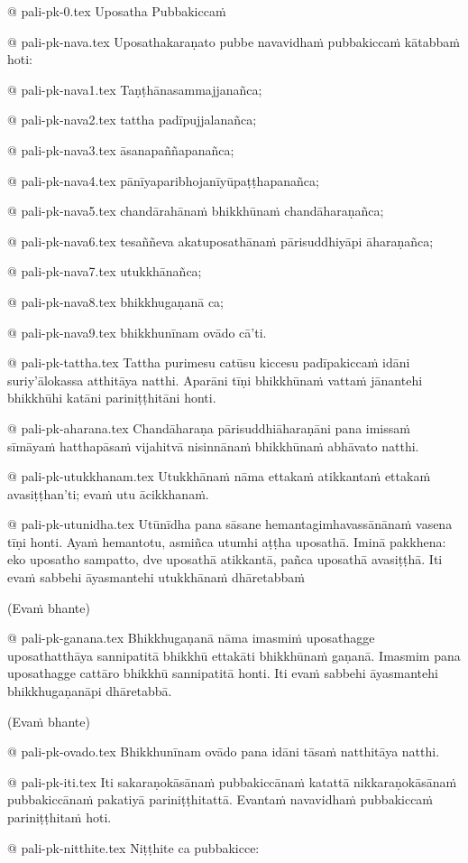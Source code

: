 @ pali-pk-0.tex
Uposatha Pubbakiccaṁ

@ pali-pk-nava.tex
Uposathakaraṇato pubbe navavidhaṁ pubbakiccaṁ kātabbaṁ hoti:

@ pali-pk-nava1.tex
Taṇṭhānasammajjanañca;

@ pali-pk-nava2.tex
tattha padīpujjalanañca;

@ pali-pk-nava3.tex
āsanapaññapanañca;

@ pali-pk-nava4.tex
pānīyaparibhojanīyūpaṭṭhapanañca;

@ pali-pk-nava5.tex
chandārahānaṁ bhikkhūnaṁ chandāharaṇañca;

@ pali-pk-nava6.tex
tesaññeva akatuposathānaṁ pārisuddhiyāpi āharaṇañca;

@ pali-pk-nava7.tex
utukkhānañca;

@ pali-pk-nava8.tex
bhikkhugaṇanā ca;

@ pali-pk-nava9.tex
bhikkhunīnam ovādo cā’ti.

@ pali-pk-tattha.tex
Tattha purimesu catūsu kiccesu padīpakiccaṁ idāni suriy’ālokassa atthitāya natthi. Aparāni tīṇi bhikkhūnaṁ vattaṁ jānantehi bhikkhūhi katāni pariniṭṭhitāni honti.

@ pali-pk-aharana.tex
Chandāharaṇa pārisuddhiāharaṇāni pana imissaṁ sīmāyaṁ hatthapāsaṁ vijahitvā nisinnānaṁ bhikkhūnaṁ abhāvato natthi.

@ pali-pk-utukkhanam.tex
Utukkhānaṁ nāma ettakaṁ atikkantaṁ ettakaṁ avasiṭṭhan’ti; evaṁ utu ācikkhanaṁ. 

@ pali-pk-utunidha.tex
Utūnīdha pana sāsane hemantagimhavassānānaṁ vasena tīṇi honti. Ayaṁ hemantotu, asmiñca utumhi aṭṭha uposathā. Iminā pakkhena: eko uposatho sampatto, dve uposathā atikkantā, pañca uposathā avasiṭṭhā.  Iti evaṁ sabbehi āyasmantehi utukkhānaṁ dhāretabbaṁ

(Evaṁ bhante)

@ pali-pk-ganana.tex
Bhikkhugaṇanā nāma imasmiṁ uposathagge uposathatthāya sannipatitā bhikkhū ettakāti bhikkhūnaṁ gaṇanā. Imasmim pana uposathagge cattāro bhikkhū sannipatitā honti. Iti evaṁ sabbehi āyasmantehi bhikkhugaṇanāpi dhāretabbā.

(Evaṁ bhante)

@ pali-pk-ovado.tex
Bhikkhunīnam ovādo pana idāni tāsaṁ natthitāya natthi.

@ pali-pk-iti.tex
Iti sakaraṇokāsānaṁ pubbakiccānaṁ katattā nikkaraṇokāsānaṁ pubbakiccānaṁ pakatiyā pariniṭṭhitattā. Evantaṁ navavidhaṁ pubbakiccaṁ pariniṭṭhitaṁ hoti.

@ pali-pk-nitthite.tex
Niṭṭhite ca pubbakicce:


